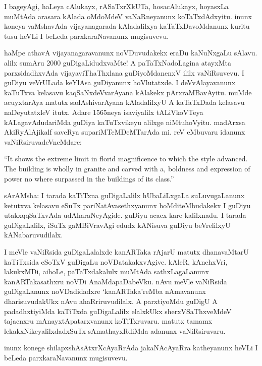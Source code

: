 \documentclass[11pt,a4size]{article}
\begin{document}
I bageyAgi, haLeya cAlukayx, rASaTxrXkUTa, hosacAlukayx, hoyasxLa
muMtAda arasara kAlada oMdoMdeV vaNaRneyanunx koTaTxdAdxyitu. inunx
koneya vaMshavAda vijayanagarada kAladalilxya kaTaTxDavoMdanunx kuritu
tusu heVLi I beLeda parxkaraNavanunx mugisuvevu.

haMpe athavA vijayanagaravanunx noVDuvudakekx eraDu kaNuNxgaLu
sAlavu. alilx sumAru 2000 guDigaLidudxvaMte! A paTaTxNadoLagina
atayxMta parxsidadhxvAda vijayaviThaThxlana guDiyoMdanenxV ililx
vaNiRsuvevu. I guDiyu veVrULada keYlAsa guDiyanunx hoVlutatxde. I
deVvAlayavanunx kaTuTxva kelasavu kaqSaNxdeVvarAyana kAlakekx
pArxraMBavAyitu. muMde acuyxtarAya matutx sadAshivarAyana kAladalilxyU
A kaTaTxDada kelasavu naDeyutatxleV itutx. Adare 1565neya isaviyalilx
tALiVkoVTeya kALagavAdudariMda guDiya kaTuTxvikeyu alilxge
niMtuhoVyitu. madArxsa AkiRyAlAjikalf saveRya supariMTeMDeMTarAda
mi. reV eMbuvaru idanunx vaNiRsiruvadeVneMdare:

{
\rm
``It shows the extreme limit in florid magnificence to which the style
advanced. The building is wholly in granite and carved with a,
boldness and expression of power no where surpassed in the buildings
of its class.''}

sArAMsha: I tarada kaTiTxna guDigaLalilx hUbaLiLxgaLa suLuvugaLanunx
ketutxva kelasavu eSuTx pariNatAvasethxyanunx hoMditeMbudakekx I
guDiyu utakxqqSaTxvAda udAharaNeyAgide. guDiyu acacx kare
kalilxnadu. I tarada guDigaLalilx, iSuTx gaMBiVravAgi edudx kANisuva
guDiyu beVrelilxyU kANabaruvudilalx.

I meVle vaNiRsida guDigaLalalxde kanARTaka rAjarU matutx dhanavaMtarU
kaTiTxsida eSoTxV guDigaLu noVDatakakxvAgive. kAleR, kAnehxVri,
lakukxMDi, aihoLe, paTaTxdakalulx muMtAda sathxLagaLanunx
kanARTakasathxru noVDi AnaMdapaDabeVku. nAvu meVle vaNiRsida
guDigaLanunx noVDadidadxre `kanARTaka'reMba nAmavanunx dharisuvudakUkx
nAvu ahaRriruvudilalx. A parxtiyoMdu guDigU A padadhxtiyiMda kaTiTxda
guDigaLalilx elalxkUkx sherxVSaThxveMdeV tajacnxru
mAnayxtApatarxvanunx koTiTxruvaru. matutx tamamx
lekakxNikeyalilxdadxSuTx sAmathayxRdiMda adanunx vaNiRsiruvaru.

inunx konege shilapxshAsAtxrXcAyaRrAda jakaNAcAyaRra katheyanunx heVLi
I beLeda parxkaraNavanunx mugisuvevu.
\end{document}
